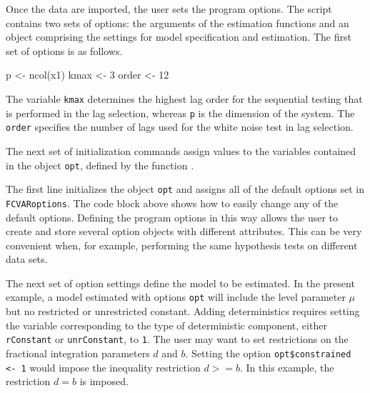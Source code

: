 \documentclass[article]{jss}
\newcommand{\fct}[1]{\code{#1()}}
\begin{document}

Once the data are imported, the user sets the program options. The script contains two sets of options: the arguments of the estimation functions and an object comprising the settings for model specification and estimation. 
The first set of options is as follows. 
\begin{Code}
p               <- ncol(x1) 
kmax            <- 3
order           <- 12
\end{Code}

The variable \verb|kmax| determines the highest lag order for the sequential testing that is performed in the lag selection, whereas \verb|p| is the dimension of the system. 
The \verb|order| specifies the number of lags used for the white noise test in lag selection.

The next set of initialization commands
assign values to the variables contained in the object \verb|opt|, defined by the function \fct{FCVARoptions}. 


The first line initializes the object \verb|opt| and assigns all of the default options set in \verb|FCVARoptions|. 
The code block above 
shows how to easily change any of the default options. 
Defining the program options in this way allows the user to create and store several option objects with different attributes. 
This can be very convenient when, for example, performing the same hypothesis tests on different data sets. 

The next set of option settings define the model to be estimated. 
In the present example, a model estimated with options \verb|opt| will include the level parameter $\mu$ but no restricted or unrestricted constant. 
Adding deterministics requires setting the variable corresponding to the type of deterministic component, either \verb|rConstant| or \verb|unrConstant|, to \verb|1|. 
% 
The user may want to set restrictions on the fractional integration parameters $d$ and $b$. 
Setting the option \verb|opt$constrained  <- 1| would impose the inequality restriction $d >= b$. 
In this example, the restriction $d = b$ is imposed. 
\end{document}
